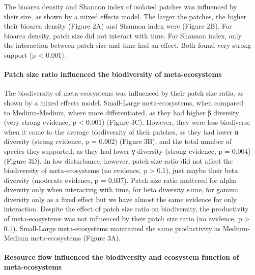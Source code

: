\documentclass[
]{article}
\begin{document}
The bioarea density and Shannon index of isolated patches was influenced
by their size, as shown by a mixed effects model. The larger the
patches, the higher their bioarea density (Figure 2A) and Shannon index
were (Figure 2B). For bioarea density, patch size did not interact with
time. For Shannon index, only the interaction between patch size and
time had an effect. Both found very strong support (p \textless{}
0.001).

\hypertarget{patch-size-ratio-influenced-the-biodiversity-of-meta-ecosystems}{%
\paragraph{Patch size ratio influenced the biodiversity of
meta-ecosystems}\label{patch-size-ratio-influenced-the-biodiversity-of-meta-ecosystems}}

The biodiversity of meta-ecosystems was influenced by their patch size
ratio, as shown by a mixed effects model. Small-Large meta-ecosystems,
when compared to Medium-Medium, where more differentiated, as they had
higher β diversity (very strong evidence, p \textless{} 0.001) (Figure
3C). However, they were less biodiverse when it came to the average
biodiversity of their patches, as they had lower α diversity (strong
evidence, p = 0.002) (Figure 3B), and the total number of species they
supported, as they had lower γ diversity (strong evidence, p = 0.004)
(Figure 3D). In low disturbance, however, patch size ratio did not
affect the biodiversity of meta-ecosystems (no evidence, p
\textgreater{} 0.1), just maybe their beta diversity (moderate evidence,
p = 0.037). Patch size ratio mattered for alpha diversity only when
interacting with time, for beta diversity same, for gamma diversity only
as a fixed effect but we have almost the same evidence for only
interaction. Despite the effect of patch size ratio on biodiversity, the
productivity of meta-ecosystems was not influenced by their patch size
ratio (no evidence, p \textgreater{} 0.1). Small-Large meta-ecosystems
maintained the same productivity as Medium-Medium meta-ecosystems
(Figure 3A).

\hypertarget{resource-flow-influenced-the-biodiversity-and-ecosystem-function-of-meta-ecosystems}{%
\paragraph{Resource flow influenced the biodiversity and ecosystem
function of
meta-ecosystems}\label{resource-flow-influenced-the-biodiversity-and-ecosystem-function-of-meta-ecosystems}}
\end{document}
